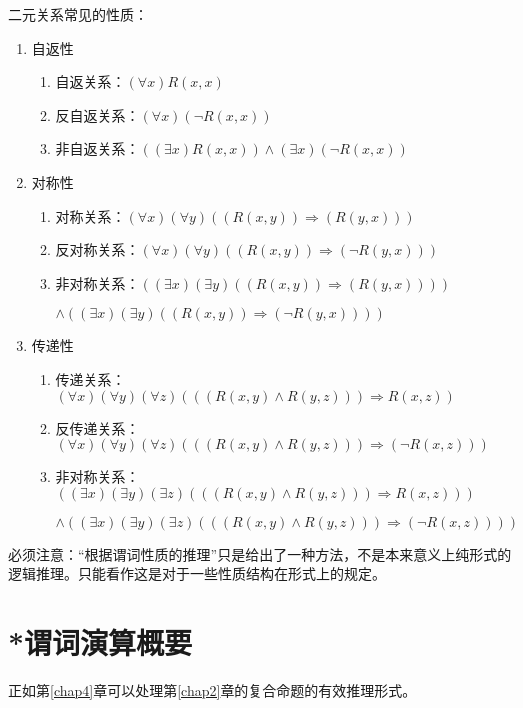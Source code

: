 \documentclass[12pt,onecolumn,a4paper]{book}
\numberwithin{table}{subsection}
\numberwithin{equation}{subsection}
\begin{document}
二元关系常见的性质：
\begin{enumerate}[itemsep=0pt,parsep=0pt]
    \item 自返性
    \begin{enumerate}[itemsep=0pt,parsep=0pt]
        \item 自返关系：$(\forall x) R(x,x)$
        \item 反自返关系：$(\forall x)(¬R(x,x))$
        \item 非自返关系：$((\exists x)R(x,x))\wedge (\exists x)(\neg R(x,x))$
    \end{enumerate}
    \item 对称性
    \begin{enumerate}[itemsep=0pt,parsep=0pt]
        \item 对称关系：$(\forall x)(\forall y)((R(x,y))\Rightarrow(R(y,x)))$
        \item 反对称关系：$(\forall x)(\forall y)((R(x,y))\Rightarrow(¬R(y,x)))$
        \item 非对称关系：$((\exists x)(\exists y)((R(x,y))\Rightarrow(R(y,x))))$
        
        $\wedge((\exists x)(\exists y)((R(x,y))\Rightarrow(¬R(y,x))))$
    \end{enumerate}
    \item 传递性
    \begin{enumerate}[itemsep=0pt,parsep=0pt]
        \item 传递关系：$(\forall x)(\forall y)(\forall z)(((R(x,y)∧R(y,z)))\Rightarrow R(x,z))$
        \item 反传递关系：$(\forall x)(\forall y)(\forall z)(((R(x,y)∧R(y,z)))\Rightarrow(¬R(x,z)))$
        \item 非对称关系：$((\exists x)(\exists y)(\exists z)(((R(x,y)∧R(y,z)))\Rightarrow R(x,z)))$
        
        $\wedge((\exists x)(\exists y)(\exists z)(((R(x,y)∧R(y,z)))\Rightarrow(¬R(x,z))))$
    \end{enumerate}
\end{enumerate}

必须注意：“根据谓词性质的推理”只是给出了一种方法，不是本来意义上纯形式的逻辑推理。只能看作这是对于一些性质结构在形式上的规定。

\chapter{*谓词演算概要}\label{chap8}


正如第\ref{chap4}章可以处理第\ref{chap2}章的复合命题的有效推理形式。
\end{document}
